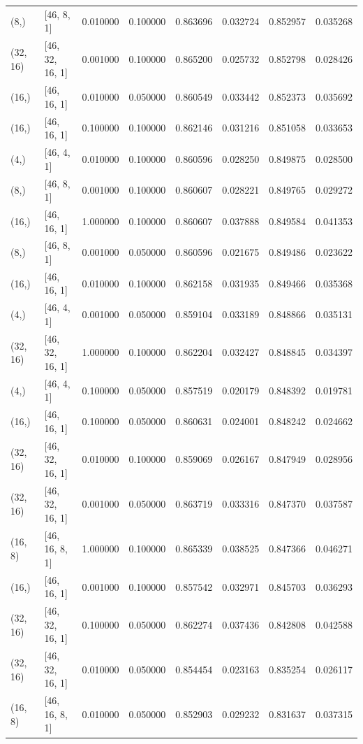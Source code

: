 \documentclass{article}
\begin{document}
\begin{longtable}{llrrrrrr}
(8,) & [46, 8, 1] & 0.010000 & 0.100000 & 0.863696 & 0.032724 & 0.852957 & 0.035268 \\
(32, 16) & [46, 32, 16, 1] & 0.001000 & 0.100000 & 0.865200 & 0.025732 & 0.852798 & 0.028426 \\
(16,) & [46, 16, 1] & 0.010000 & 0.050000 & 0.860549 & 0.033442 & 0.852373 & 0.035692 \\
(16,) & [46, 16, 1] & 0.100000 & 0.100000 & 0.862146 & 0.031216 & 0.851058 & 0.033653 \\
(4,) & [46, 4, 1] & 0.010000 & 0.100000 & 0.860596 & 0.028250 & 0.849875 & 0.028500 \\
(8,) & [46, 8, 1] & 0.001000 & 0.100000 & 0.860607 & 0.028221 & 0.849765 & 0.029272 \\
(16,) & [46, 16, 1] & 1.000000 & 0.100000 & 0.860607 & 0.037888 & 0.849584 & 0.041353 \\
(8,) & [46, 8, 1] & 0.001000 & 0.050000 & 0.860596 & 0.021675 & 0.849486 & 0.023622 \\
(16,) & [46, 16, 1] & 0.010000 & 0.100000 & 0.862158 & 0.031935 & 0.849466 & 0.035368 \\
(4,) & [46, 4, 1] & 0.001000 & 0.050000 & 0.859104 & 0.033189 & 0.848866 & 0.035131 \\
(32, 16) & [46, 32, 16, 1] & 1.000000 & 0.100000 & 0.862204 & 0.032427 & 0.848845 & 0.034397 \\
(4,) & [46, 4, 1] & 0.100000 & 0.050000 & 0.857519 & 0.020179 & 0.848392 & 0.019781 \\
(16,) & [46, 16, 1] & 0.100000 & 0.050000 & 0.860631 & 0.024001 & 0.848242 & 0.024662 \\
(32, 16) & [46, 32, 16, 1] & 0.010000 & 0.100000 & 0.859069 & 0.026167 & 0.847949 & 0.028956 \\
(32, 16) & [46, 32, 16, 1] & 0.001000 & 0.050000 & 0.863719 & 0.033316 & 0.847370 & 0.037587 \\
(16, 8) & [46, 16, 8, 1] & 1.000000 & 0.100000 & 0.865339 & 0.038525 & 0.847366 & 0.046271 \\
(16,) & [46, 16, 1] & 0.001000 & 0.100000 & 0.857542 & 0.032971 & 0.845703 & 0.036293 \\
(32, 16) & [46, 32, 16, 1] & 0.100000 & 0.050000 & 0.862274 & 0.037436 & 0.842808 & 0.042588 \\
(32, 16) & [46, 32, 16, 1] & 0.010000 & 0.050000 & 0.854454 & 0.023163 & 0.835254 & 0.026117 \\
(16, 8) & [46, 16, 8, 1] & 0.010000 & 0.050000 & 0.852903 & 0.029232 & 0.831637 & 0.037315 \\

\end{longtable}
\end{document}
